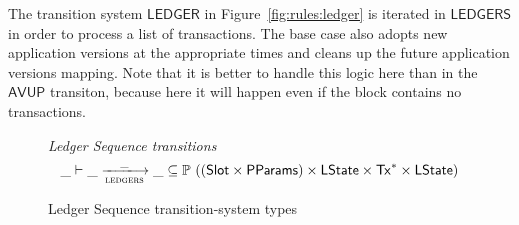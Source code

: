 \clearpage

The transition system $\mathsf{LEDGER}$ in Figure~\ref{fig:rules:ledger} is iterated
in $\mathsf{LEDGERS}$ in order to process a list of transactions.
The base case also adopts new application versions at the appropriate times
and cleans up the future application versions mapping.
Note that it is better to handle this logic here than in the $\mathsf{AVUP}$ transiton,
because here it will happen even if the block contains no transactions.

\begin{figure}[htb]
  \emph{Ledger Sequence transitions}
  \begin{equation*}
    \_ \vdash
    \var{\_} \trans{ledgers}{\_} \var{\_}
    \subseteq \powerset ((\Slot\times\PParams) \times \LState \times \seqof{\Tx} \times \LState)
  \end{equation*}
  \caption{Ledger Sequence transition-system types}
  \label{fig:ts-types:ledgers}
\end{figure}

